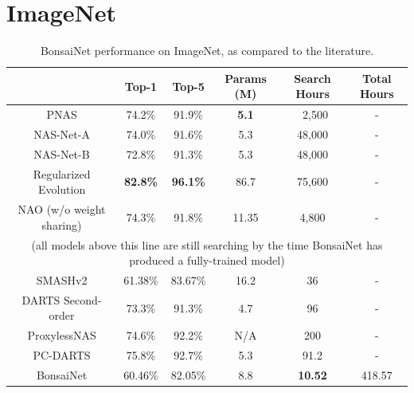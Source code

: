 \section{ImageNet}
\begin{table}[ht]
\begin{center}
\begin{tabular}{c|c|c|c|c|c}
 & Top-1 & Top-5 & Params (M) & Search Hours & Total Hours\\
\hline
PNAS                        & 74.2\%                        & 91.9\%            & \textbf{5.1}  & ~2,500        & -			\\
NAS-Net-A                   & 74.0\%                        & 91.6\%            & 5.3           & 48,000        & -			\\
NAS-Net-B                   & 72.8\%                        & 91.3\%            & 5.3           & 48,000        & -			\\
Regularized Evolution       & \textbf{82.8\%}               & \textbf{96.1\%}   & 86.7          & 75,600        & -			\\
NAO (w/o weight sharing)    & 74.3\%                        & 91.8\%            & 11.35         & 4,800         & -			\\
\multicolumn{6}{c}{\scriptsize{(all models above this line are still searching by the time BonsaiNet has produced a fully-trained model)}} \\ \hline
SMASHv2                     & 61.38\%                       & 83.67\%           & 16.2          & 36		    & -			\\
DARTS Second-order     	    & 73.3\%                        & 91.3\%            & 4.7           & 96            & -			\\
ProxylessNAS                & 74.6\%                        & 92.2\%            & N/A           & 200           & -			\\
PC-DARTS                    & 75.8\%   	                    & 92.7\%             & 5.3           & 91.2          & -			\\ \hline
BonsaiNet					& 60.46\%						& 82.05\%			& 8.8			& \textbf{10.52}			& 418.57   	\\
\end{tabular}
\end{center}
\caption[BonsaiNet performance on ImageNet]{BonsaiNet performance on ImageNet, as compared to the literature.}
\label{tab:bonsai_imagenet}
\end{table}

